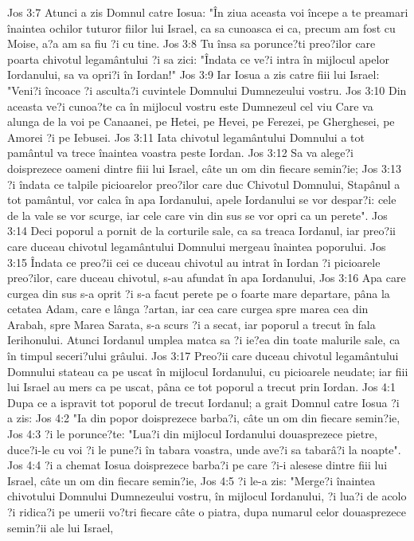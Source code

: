 Jos 3:7  Atunci a zis Domnul catre Iosua: "În ziua aceasta voi începe a te preamari înaintea ochilor tuturor fiilor lui Israel, ca sa cunoasca ei ca, precum am fost cu Moise, a?a am sa fiu ?i cu tine.
Jos 3:8  Tu însa sa porunce?ti preo?ilor care poarta chivotul legamântului ?i sa zici: "Îndata ce ve?i intra în mijlocul apelor Iordanului, sa va opri?i în Iordan!"
Jos 3:9  Iar Iosua a zis catre fiii lui Israel: "Veni?i încoace ?i asculta?i cuvintele Domnului Dumnezeului vostru.
Jos 3:10  Din aceasta ve?i cunoa?te ca în mijlocul vostru este Dumnezeul cel viu Care va alunga de la voi pe Canaanei, pe Hetei, pe Hevei, pe Ferezei, pe Gherghesei, pe Amorei ?i pe Iebusei.
Jos 3:11  Iata chivotul legamântului Domnului a tot pamântul va trece înaintea voastra peste Iordan.
Jos 3:12  Sa va alege?i doisprezece oameni dintre fiii lui Israel, câte un om din fiecare semin?ie;
Jos 3:13  ?i îndata ce talpile picioarelor preo?ilor care duc Chivotul Domnului, Stapânul a tot pamântul, vor calca în apa Iordanului, apele Iordanului se vor despar?i: cele de la vale se vor scurge, iar cele care vin din sus se vor opri ca un perete".
Jos 3:14  Deci poporul a pornit de la corturile sale, ca sa treaca Iordanul, iar preo?ii care duceau chivotul legamântului Domnului mergeau înaintea poporului.
Jos 3:15  Îndata ce preo?ii cei ce duceau chivotul au intrat în Iordan ?i picioarele preo?ilor, care duceau chivotul, s-au afundat în apa Iordanului,
Jos 3:16  Apa care curgea din sus s-a oprit ?i s-a facut perete pe o foarte mare departare, pâna la cetatea Adam, care e lânga ?artan, iar cea care curgea spre marea cea din Arabah, spre Marea Sarata, s-a scurs ?i a secat, iar poporul a trecut în fala Ierihonului. Atunci Iordanul umplea matca sa ?i ie?ea din toate malurile sale, ca în timpul seceri?ului grâului.
Jos 3:17  Preo?ii care duceau chivotul legamântului Domnului stateau ca pe uscat în mijlocul Iordanului, cu picioarele neudate; iar fiii lui Israel au mers ca pe uscat, pâna ce tot poporul a trecut prin Iordan.
Jos 4:1  Dupa ce a ispravit tot poporul de trecut Iordanul; a grait Domnul catre Iosua ?i a zis:
Jos 4:2  "Ia din popor doisprezece barba?i, câte un om din fiecare semin?ie,
Jos 4:3  ?i le porunce?te: "Lua?i din mijlocul Iordanului douasprezece pietre, duce?i-le cu voi ?i le pune?i în tabara voastra, unde ave?i sa tabarâ?i la noapte".
Jos 4:4  ?i a chemat Iosua doisprezece barba?i pe care ?i-i alesese dintre fiii lui Israel, câte un om din fiecare semin?ie,
Jos 4:5  ?i le-a zis: "Merge?i înaintea chivotului Domnului Dumnezeului vostru, în mijlocul Iordanului, ?i lua?i de acolo ?i ridica?i pe umerii vo?tri fiecare câte o piatra, dupa numarul celor douasprezece semin?ii ale lui Israel,
